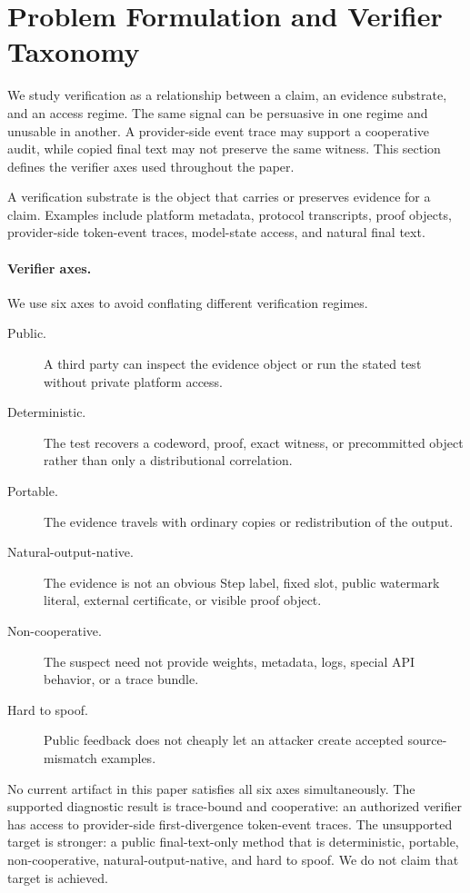 \section{Problem Formulation and Verifier Taxonomy}
\label{sec:setup}

We study verification as a relationship between a claim, an evidence substrate,
and an access regime.  The same signal can be persuasive in one regime and
unusable in another.  A provider-side event trace may support a cooperative
audit, while copied final text may not preserve the same witness.  This section
defines the verifier axes used throughout the paper.

\begin{definition}
A verification substrate is the object that carries or preserves evidence for a
claim.  Examples include platform metadata, protocol transcripts, proof
objects, provider-side token-event traces, model-state access, and natural
final text.
\end{definition}

\paragraph{Verifier axes.}
We use six axes to avoid conflating different verification regimes.
\begin{description}
\item[Public.] A third party can inspect the evidence object or run the stated
test without private platform access.
\item[Deterministic.] The test recovers a codeword, proof, exact witness, or
precommitted object rather than only a distributional correlation.
\item[Portable.] The evidence travels with ordinary copies or redistribution of
the output.
\item[Natural-output-native.] The evidence is not an obvious Step label, fixed
slot, public watermark literal, external certificate, or visible proof object.
\item[Non-cooperative.] The suspect need not provide weights, metadata, logs,
special API behavior, or a trace bundle.
\item[Hard to spoof.] Public feedback does not cheaply let an attacker create
accepted source-mismatch examples.
\end{description}

No current artifact in this paper satisfies all six axes simultaneously.  The
supported diagnostic result is trace-bound and cooperative: an authorized
verifier has access to provider-side first-divergence token-event traces.  The
unsupported target is stronger: a public final-text-only method that is
deterministic, portable, non-cooperative, natural-output-native, and hard to
spoof.  We do not claim that target is achieved.

